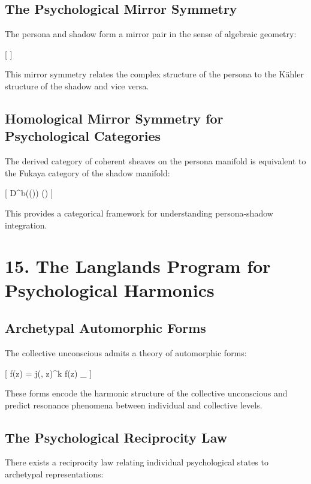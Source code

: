 \documentclass[12pt]{article}
\begin{document}
\subsection*{The Psychological Mirror Symmetry}

The persona and shadow form a mirror pair in the sense of algebraic geometry:

[
 \leftrightarrow {}
]

This mirror symmetry relates the complex structure of the persona to the Kähler structure of the shadow and vice versa.

\subsection*{Homological Mirror Symmetry for Psychological Categories}

The derived category of coherent sheaves on the persona manifold is equivalent to the Fukaya category of the shadow manifold:

[
D^b(()) \cong {}()
]

This provides a categorical framework for understanding persona-shadow integration.

\section*{15. The Langlands Program for Psychological Harmonics}

\subsection*{Archetypal Automorphic Forms}

The collective unconscious admits a theory of automorphic forms:

[
f(\gamma z) = j(\gamma, z)^k f(z) \quad {} \gamma \in \Gamma_{}
]

These forms encode the harmonic structure of the collective unconscious and predict resonance phenomena between individual and collective levels.

\subsection*{The Psychological Reciprocity Law}

There exists a reciprocity law relating individual psychological states to archetypal representations:
\end{document}
